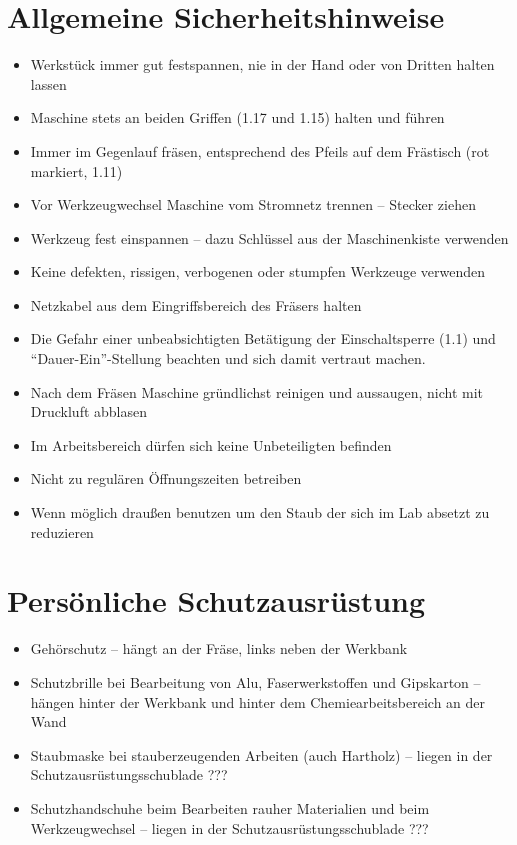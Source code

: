 \documentclass{\basedir/fablab-document}
\begin{document}
\section[Allgemeine Sicherheitshinweise]{Allgemeine Sicherheitshinweise}
\begin{itemize}
\item Werkstück immer gut festspannen, nie in der Hand oder von Dritten halten lassen
\item Maschine stets an beiden Griffen (1.17 und 1.15) halten und führen
\item Immer im Gegenlauf fräsen, entsprechend des Pfeils auf dem Frästisch (rot markiert, 1.11)
\item Vor Werkzeugwechsel Maschine vom Stromnetz trennen -- Stecker ziehen
\item Werkzeug fest einspannen -- dazu Schlüssel aus der Maschinenkiste verwenden
\item Keine defekten, rissigen, verbogenen oder stumpfen Werkzeuge verwenden
\item Netzkabel aus dem Eingriffsbereich des Fräsers halten
\item Die Gefahr einer unbeabsichtigten Betätigung der Einschaltsperre (1.1) und ``Dauer-Ein''-Stellung beachten und sich damit vertraut machen.
\item Nach dem Fräsen Maschine gründlichst reinigen und aussaugen, nicht mit Druckluft abblasen
\item Im Arbeitsbereich dürfen sich keine Unbeteiligten befinden
\item Nicht zu regulären Öffnungszeiten betreiben 
\item Wenn möglich draußen benutzen um den Staub der sich im Lab absetzt zu reduzieren
\end{itemize}


\section{Persönliche Schutzausrüstung}
\begin{itemize}
\item Gehörschutz -- hängt an der Fräse, links neben der Werkbank
\item Schutzbrille bei Bearbeitung von Alu, Faserwerkstoffen und Gipskarton -- hängen hinter der Werkbank und hinter dem Chemiearbeitsbereich an der Wand
\item Staubmaske bei stauberzeugenden Arbeiten (auch Hartholz) -- liegen in der Schutzausrüstungsschublade ???
\item Schutzhandschuhe beim Bearbeiten rauher Materialien und beim Werkzeugwechsel -- liegen in der Schutzausrüstungsschublade ???
\end{itemize}
\end{document}
